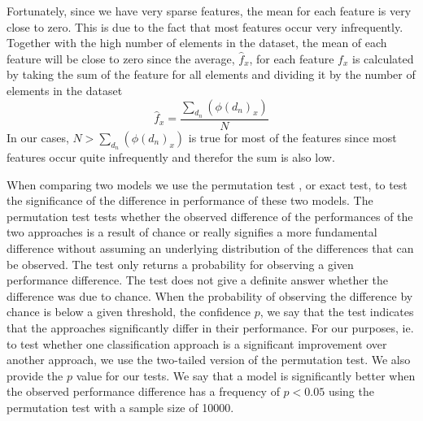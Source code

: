 
Fortunately, since we have very sparse features, the mean for each feature is very close to zero.
This is due to the fact that most features occur very infrequently. Together with the high number of elements in the dataset, the mean of each feature will be close to zero since the average, $\hat{f}_x$, for each feature $f_x$ is calculated by taking the sum of the feature for all elements and dividing it by the number of elements in the dataset
\begin{equation*}
\hat{f}_x = \frac{\sum_{d_n} (\phi(d_n)_x)}{N}
\end{equation*}
In our cases, $N > \sum_{d_n} (\phi(d_n)_x)$ is true for most of the features since most features occur quite infrequently and therefor the sum is also low.

When comparing two models we use the permutation test \cite{Fisher1925}, or exact test, to test the significance of the difference in performance of these two models.
The permutation test tests whether the observed difference of the performances of the two approaches is a result of chance or really signifies a more fundamental difference without assuming an underlying distribution of the differences that can be observed.
The test only returns a probability for observing a given performance difference. The test does not give a definite answer whether the difference was due to chance.
When the probability of observing the difference by chance is below a given threshold, the confidence $p$, we say that the test indicates that the approaches significantly differ in their performance.
For our purposes, ie. to test whether one classification approach is a significant improvement over another approach, we use the two-tailed version \cite{Kock2015} of the permutation test.
We also provide the $p$ value for our tests.
We say that a model is significantly better when the observed performance difference has a frequency of $p < 0.05$ using the permutation test with a sample size of 10000.


